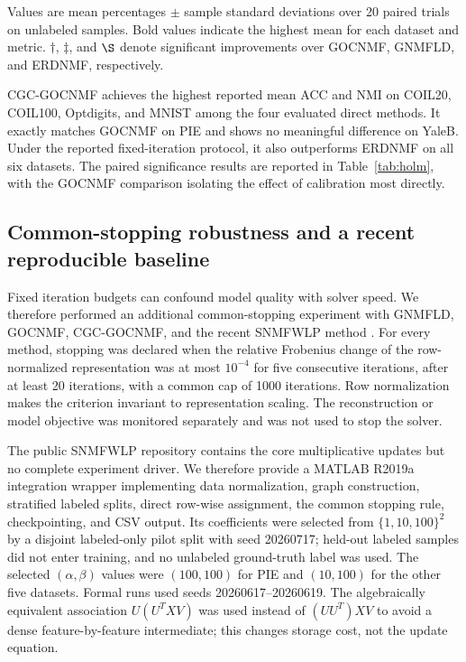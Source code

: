 \documentclass[11pt]{article}
\newenvironment{widetable}
  {\begin{strip}\centering\captionsetup{type=table}}
  {\end{strip}}
\theoremstyle{remark}
\begin{document}
\begin{widetable}
\vspace{1mm}
\parbox{0.98\linewidth}{\footnotesize Values are mean percentages $\pm$ sample standard deviations over 20 paired trials on unlabeled samples. Bold values indicate the highest mean for each dataset and metric. $\dagger$, $\ddagger$, and $\S$ denote significant improvements over GOCNMF, GNMFLD, and ERDNMF, respectively.}
\end{widetable}

CGC-GOCNMF achieves the highest reported mean ACC and NMI on COIL20, COIL100, Optdigits, and MNIST among the four evaluated direct methods. It exactly matches GOCNMF on PIE and shows no meaningful difference on YaleB. Under the reported fixed-iteration protocol, it also outperforms ERDNMF on all six datasets. The paired significance results are reported in Table~\ref{tab:holm}, with the GOCNMF comparison isolating the effect of calibration most directly.

\subsection{Common-stopping robustness and a recent reproducible baseline}
\label{subsec:common_stop}

Fixed iteration budgets can confound model quality with solver speed. We therefore performed an additional common-stopping experiment with GNMFLD, GOCNMF, CGC-GOCNMF, and the recent SNMFWLP method \cite{Jing2026SNMFWLP}. For every method, stopping was declared when the relative Frobenius change of the row-normalized representation was at most $10^{-4}$ for five consecutive iterations, after at least 20 iterations, with a common cap of 1000 iterations. Row normalization makes the criterion invariant to representation scaling. The reconstruction or model objective was monitored separately and was not used to stop the solver.

The public SNMFWLP repository contains the core multiplicative updates but no complete experiment driver. We therefore provide a MATLAB R2019a integration wrapper implementing data normalization, graph construction, stratified labeled splits, direct row-wise assignment, the common stopping rule, checkpointing, and CSV output. Its coefficients were selected from $\{1,10,100\}^2$ by a disjoint labeled-only pilot split with seed 20260717; held-out labeled samples did not enter training, and no unlabeled ground-truth label was used. The selected $(\alpha,\beta)$ values were $(100,100)$ for PIE and $(10,100)$ for the other five datasets. Formal runs used seeds 20260617--20260619. The algebraically equivalent association $U(U^TXV)$ was used instead of $(UU^T)XV$ to avoid a dense feature-by-feature intermediate; this changes storage cost, not the update equation.
\end{document}
